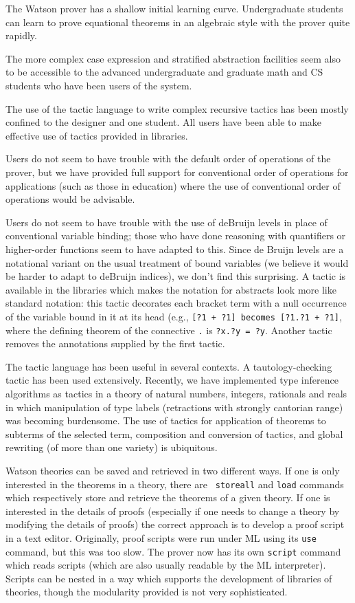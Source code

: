 \documentclass{kluwer}
\begin{document}
\begin{article}
The Watson prover has a shallow initial learning curve.  Undergraduate
students can learn to prove equational theorems in an algebraic style
with the prover quite rapidly.

The more complex case expression and stratified abstraction facilities
seem also to be accessible to the advanced undergraduate and graduate
math and CS students who have been users of the system.

The use of the tactic language to write complex recursive tactics has
been mostly confined to the designer and one student.  All users have
been able to make effective use of tactics provided in libraries.

Users do not seem to have trouble with the default order of operations of
the prover, but we have provided full support for conventional order of 
operations for applications (such as those in education) where the use
of conventional order of operations would be advisable.

Users do not seem to have trouble with the use of deBruijn levels in
place of conventional variable binding; those who have done reasoning
with quantifiers or higher-order functions seem to have adapted to
this.  Since de Bruijn levels are a notational variant on the usual
treatment of bound variables (we believe it would be harder to adapt
to deBruijn indices), we don't find this surprising.  A tactic is
available in the libraries which makes the notation for abstracts look
more like standard notation: this tactic decorates each bracket term
with a null occurrence of the variable bound in it at its head (e.g.,
{\tt [?1 + ?1] becomes [?1.?1 + ?1]}, where the defining theorem of
the connective {\tt .} is {\tt ?x.?y = ?y}.  Another tactic removes
the annotations supplied by the first tactic.

The tactic language has been useful in several contexts.  A
tautology-checking tactic has been used extensively.  Recently, we
have implemented type inference algorithms as tactics in a theory of
natural numbers, integers, rationals and reals in which manipulation
of type labels (retractions with strongly cantorian range) was
becoming burdensome.  The use of tactics for application of theorems
to subterms of the selected term, composition and conversion of
tactics, and global rewriting (of more than one variety) is
ubiquitous.

Watson theories can be saved and retrieved in two different ways.  If
one is only interested in the theorems in a theory, there are {\tt
storeall} and {\tt load} commands which respectively store and
retrieve the theorems of a given theory.  If one is interested in the
details of proofs (especially if one needs to change a theory by
modifying the details of proofs) the correct approach is to develop a
proof script in a text editor.  Originally, proof scripts were run
under ML using its {\tt use} command, but this was too slow.  The
prover now has its own {\tt script} command which reads scripts (which
are also usually readable by the ML interpreter).  Scripts can be
nested in a way which supports the development of libraries of
theories, though the modularity provided is not very sophisticated.


\end{article}
\end{document}
